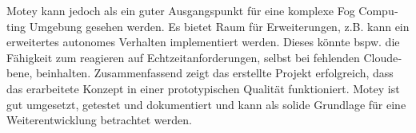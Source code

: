 \begin{otherlanguage}{ngerman}
Motey kann jedoch als ein guter Ausgangspunkt für eine komplexe Fog Computing Umgebung gesehen werden.
Es bietet Raum für Erweiterungen, z.B. kann ein erweitertes autonomes Verhalten implementiert werden.
Dieses könnte bspw. die Fähigkeit zum reagieren auf Echtzeitanforderungen, selbst bei fehlenden Cloudebene, beinhalten.
Zusammenfassend zeigt das erstellte Projekt erfolgreich, dass das erarbeitete Konzept in einer prototypischen Qualität funktioniert.
Motey ist gut umgesetzt, getestet und dokumentiert und kann als solide Grundlage für eine Weiterentwicklung betrachtet werden.
\end{otherlanguage}
